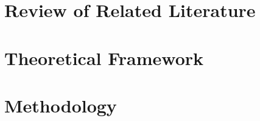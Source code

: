  







\begin{SingleSpace}
	\tableofcontents
	\cleardoublepage
	
	\listoffigures
	\cleardoublepage
	
\end{SingleSpace}

\DoubleSpacing
{}

\chapter{Review of Related Literature} 
	\label{ch:rrl} 
	
	\clearpage

\chapter{Theoretical Framework} 
	\label{ch:theory} 
	
	\clearpage

\chapter{Methodology}
	\label{ch:method}
	
	\clearpage


\printbibliography


